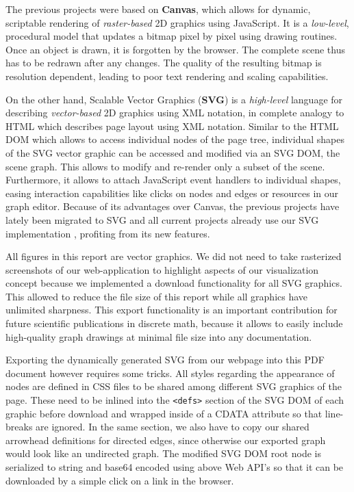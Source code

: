 The previous projects were based on \textbf{Canvas}, which allows for dynamic, scriptable rendering of \textit{raster-based} 2D graphics using JavaScript. It is a \textit{low-level}, procedural model that updates a bitmap pixel by pixel using drawing routines. Once an object is drawn, it is forgotten by the browser. The complete scene thus has to be redrawn after any changes. The quality of the resulting bitmap is resolution dependent, leading to poor text rendering and scaling capabilities. 

On the other hand, Scalable Vector Graphics (\textbf{SVG}) is a \textit{high-level} language for describing \textit{vector-based} 2D graphics using XML notation, in complete analogy to HTML which describes page layout using XML notation. Similar to the HTML DOM which allows to access individual nodes of the page tree, individual shapes of the SVG vector graphic can be accessed and modified via an SVG DOM, the scene graph. This allows to modify and re-render only a subset of the scene. Furthermore, it allows to attach JavaScript event handlers to individual shapes, easing interaction capabilities like clicks on nodes and edges or resources in our graph editor. Because of its advantages over Canvas, the previous projects have lately been migrated to SVG \cite{feil2016idp} and all current projects already use our SVG implementation \cite{feil2016idp,fischer2016idp}, profiting from its new features.

All figures in this report are vector graphics. We did not need to take rasterized screenshots of our web-application to highlight aspects of our visualization concept because we implemented a download functionality for all SVG graphics. This allowed to reduce the file size of this report while all graphics have unlimited sharpness. This export functionality is an important contribution for future scientific publications in discrete math, because it allows to easily include high-quality graph drawings at minimal file size into any documentation.

Exporting the dynamically generated SVG from our webpage into this PDF document however requires some tricks. All styles regarding the appearance of nodes are defined in CSS files to be shared among different SVG graphics of the page. These need to be inlined into the \texttt{<defs>} section of the SVG DOM of each graphic before download and wrapped inside of a CDATA attribute so that line-breaks are ignored. In the same section, we also have to copy our shared arrowhead definitions for directed edges, since otherwise our exported graph would look like an undirected graph. The modified SVG DOM root node is serialized to string and base64 encoded using above Web API's so that it can be downloaded by a simple click on a link in the browser. 

